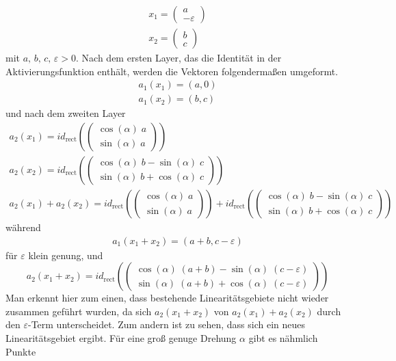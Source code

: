 \documentclass[12pt]{article}
\begin{document}
\begin{align*}
    x_1=\left(\begin{array}{c}a\\-\varepsilon\end{array}\right)\\
    x_2=\left(\begin{array}{c}b\\c\end{array}\right)
\end{align*}
mit $a,\,b,\,c,\,\varepsilon>0$. Nach dem ersten Layer, das die Identität in der Aktivierungsfunktion enthält, werden die Vektoren folgendermaßen umgeformt.
\begin{align*}
    a_1(x_1)=(a,0)\\
    a_1(x_2)=(b,c)
\end{align*}
und nach dem zweiten Layer
\begin{gather*}
a_2(x_1)=id_\text{rect}\left(\left(\begin{array}{c}\cos(\alpha)\;a\\\sin(\alpha)\;a\end{array}\right)\right)\\
a_2(x_2)=id_\text{rect}\left(\left(\begin{array}{c}\cos(\alpha)\;b-\sin(\alpha)\;c\\\sin(\alpha)\;b+\cos(\alpha)\;c\end{array}\right)\right)\\
a_2(x_1)+a_2(x_2)=id_\text{rect}\left(\left(\begin{array}{c}\cos(\alpha)\;a\\\sin(\alpha)\;a\end{array}\right)\right)+id_\text{rect}\left(\left(\begin{array}{c}\cos(\alpha)\;b-\sin(\alpha)\;c\\\sin(\alpha)\;b+\cos(\alpha)\;c\end{array}\right)\right)
\end{gather*}
während 
\begin{align*}
    a_1(x_1+x_2)=(a+b,c-\varepsilon)
\end{align*}
für $\varepsilon$ klein genung, und
$$a_2(x_1+x_2)=id_\text{rect}\left(\left(\begin{array}{c}\cos(\alpha)\;(a+b)-\sin(\alpha)\;(c-\varepsilon)\\\sin(\alpha)\;(a+b)+\cos(\alpha)\;(c-\varepsilon)\end{array}\right)\right)$$
Man erkennt hier zum einen, dass bestehende Linearitätsgebiete nicht wieder zusammen geführt wurden, da sich $a_2(x_1+x_2)$ von $a_2(x_1)+a_2(x_2)$ durch den $\varepsilon$-Term unterscheidet. Zum andern ist zu sehen, dass sich ein neues Linearitätsgebiet ergibt. Für eine groß genuge Drehung $\alpha$ gibt es nähmlich Punkte
\end{document}
